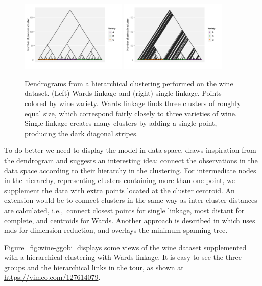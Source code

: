 \documentclass[preprint]{imsart}
\begin{document}
\begin{figure}[htbp]
  \centering
    \includegraphics[width=0.45\textwidth]{wine-ward}
    \includegraphics[width=0.45\textwidth]{wine-single}
  \caption{Dendrograms from a hierarchical clustering performed on the wine dataset.  (Left) Wards linkage and (right) single linkage.  Points colored by wine variety.  Wards linkage finds three clusters of roughly equal size, which correspond fairly closely to three varieties of wine.  Single linkage creates many clusters by adding a single point, producing the dark diagonal stripes. }
  \label{fig:wine-dendro}
\end{figure}

To do better we need to display the model in data space.  \citet{Buja96interactivehigh-dimensional} draws inspiration from the dendrogram and suggests an interesting idea: connect the observations in the data space according to their hierarchy in the clustering.  For intermediate nodes in the hierarchy, representing clusters containing more than one point, we supplement the data with extra points located at the cluster centroid.   An extension would be to connect clusters in the same way as inter-cluster distances are calculated, i.e.,\ connect closest points for single linkage, most distant for complete, and centroids for Wards.  Another approach is described in \citet{kim:2000} which uses {\sc mds} for dimension reduction, and overlays the minimum spanning tree.

Figure~\ref{fig:wine-ggobi} displays some views of the wine dataset supplemented with a hierarchical clustering with Wards linkage.  It is easy to see the three groups and the hierarchical links in the tour, as shown at \url{https://vimeo.com/127614079}.
\end{document}
